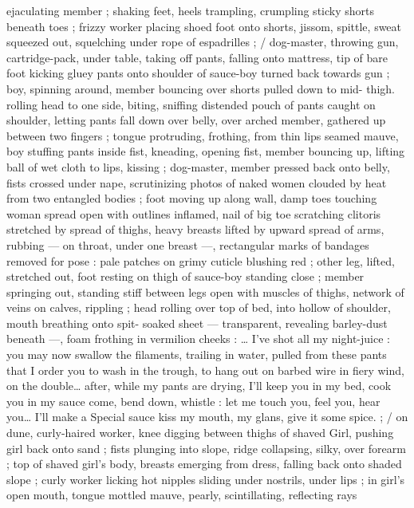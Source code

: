 ejaculating member ; shaking feet, heels trampling, crumpling sticky 
shorts beneath toes ; frizzy worker placing shoed foot onto shorts, 
jissom, spittle, sweat squeezed out, squelching under rope of 
espadrilles ; {\slash} dog-master, throwing gun, cartridge-pack, under table, 
taking off pants, falling onto mattress, tip of bare foot kicking gluey 
pants onto shoulder of sauce-boy turned back towards gun ; boy, 
spinning around, member bouncing over shorts pulled down to mid- 
thigh. rolling head to one side, biting, sniffing distended pouch of 
pants caught on shoulder, letting pants fall down over belly, over 
arched member, gathered up between two fingers ; tongue 
protruding, frothing, from thin lips seamed mauve, boy stuffing pants 
inside fist, kneading, opening fist, member bouncing up, lifting ball 
of wet cloth to lips, kissing ; dog-master, member pressed back onto 
belly, fists crossed under nape, scrutinizing photos of naked women 
clouded by heat from two entangled bodies ; foot moving up along 
wall, damp toes touching woman spread open with outlines inflamed, 
nail of big toe scratching clitoris stretched by spread of thighs, 
heavy breasts lifted by upward spread of arms, rubbing --- on throat, 
under one breast ---, rectangular marks of bandages removed for 
pose : pale patches on grimy cuticle blushing red ; other leg, lifted, 
stretched out, foot resting on thigh of sauce-boy standing close ; 
member springing out, standing stiff between legs open with 
muscles of thighs, network of veins on calves, rippling ; head rolling 
over top of bed, into hollow of shoulder, mouth breathing onto spit- 
soaked sheet --- transparent, revealing barley-dust beneath ---, 
foam frothing in vermilion cheeks : {\td} {\gl} {\ldots} I've shot all my night-juice 
: you may now swallow the filaments, trailing in water, pulled from 
these pants that I order you to wash in the trough, to hang out on 
barbed wire in fiery wind, on the double{\ldots} after, while my pants are 
drying, I'll keep you in my bed, cook you in my sauce{\td} come, bend 
down, whistle : let me touch you, feel you, hear you{\ldots} I'll make a 
Special sauce{\td} kiss my mouth, my glans, give it some spice.{\gr} ; {\slash} on 
dune, curly-haired worker, knee digging between thighs of shaved 
Girl, pushing girl back onto sand ; fists plunging into slope, ridge 
collapsing, silky, over forearm ; top of shaved girl's body, breasts 
emerging from dress, falling back onto shaded slope ; curly worker 
licking hot nipples sliding under nostrils, under lips ; in girl's open 
mouth, tongue mottled mauve, pearly, scintillating, reflecting rays 
